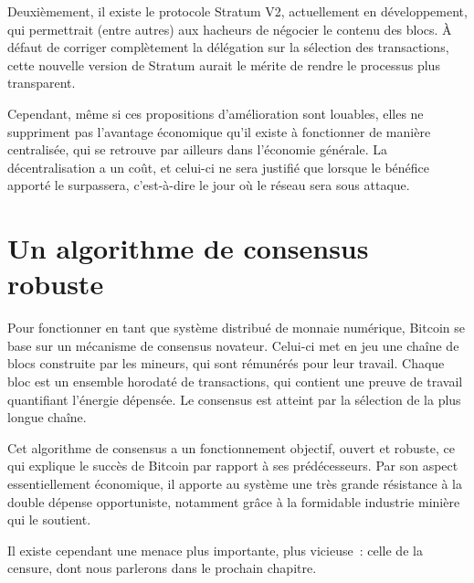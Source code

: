 Deuxièmement, il existe le protocole Stratum V2, actuellement en développement, qui permettrait (entre autres) aux hacheurs de négocier le contenu des blocs. À défaut de corriger complètement la délégation sur la sélection des transactions, cette nouvelle version de Stratum aurait le mérite de rendre le processus plus transparent.

Cependant, même si ces propositions d'amélioration sont louables, elles ne suppriment pas l'avantage économique qu'il existe à fonctionner de manière centralisée, qui se retrouve par ailleurs dans l'économie générale. La décentralisation a un coût, et celui-ci ne sera justifié que lorsque le bénéfice apporté le surpassera, c'est-à-dire le jour où le réseau sera sous attaque.

\section*{Un algorithme de consensus robuste}

Pour fonctionner en tant que système distribué de monnaie numérique, Bitcoin se base sur un mécanisme de consensus novateur. Celui-ci met en jeu une chaîne de blocs construite par les mineurs, qui sont rémunérés pour leur travail. Chaque bloc est un ensemble horodaté de transactions, qui contient une preuve de travail quantifiant l'énergie dépensée. Le consensus est atteint par la sélection de la plus longue chaîne.

Cet algorithme de consensus a un fonctionnement objectif, ouvert et robuste, ce qui explique le succès de Bitcoin par rapport à ses prédécesseurs. Par son aspect essentiellement économique, il apporte au système une très grande résistance à la double dépense opportuniste, notamment grâce à la formidable industrie minière qui le soutient.

Il existe cependant une menace plus importante, plus vicieuse~: celle de la censure, dont nous parlerons dans le prochain chapitre.

\printendnotes